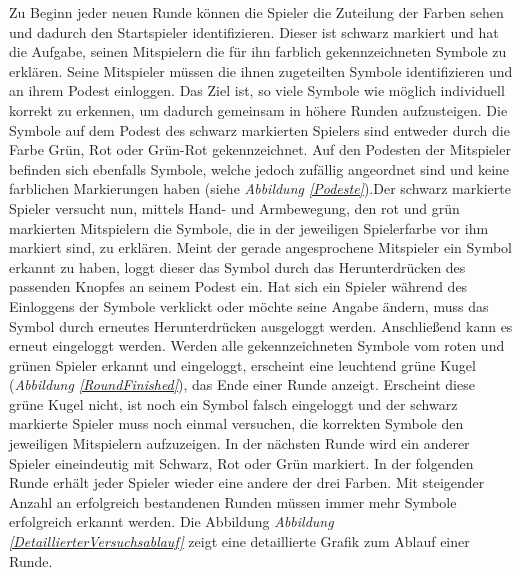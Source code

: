 \documentclass[a4paper,11pt]{article}%
\renewcommand{\\}{\vspace*{0.5\baselineskip} \newline}
\begin{document}
Zu Beginn jeder neuen Runde können die Spieler die Zuteilung der Farben sehen und dadurch den Startspieler identifizieren. Dieser ist schwarz markiert und hat die Aufgabe, seinen Mitspielern die für ihn farblich gekennzeichneten Symbole zu erklären. Seine Mitspieler müssen die ihnen zugeteilten Symbole identifizieren und an ihrem Podest einloggen. Das Ziel ist, so viele Symbole wie möglich individuell korrekt zu erkennen, um dadurch gemeinsam in höhere Runden aufzusteigen.
Die Symbole auf dem Podest des schwarz markierten Spielers sind entweder durch die Farbe Grün, Rot oder Grün-Rot gekennzeichnet. Auf den Podesten der Mitspieler befinden sich ebenfalls Symbole, welche jedoch zufällig angeordnet sind und keine farblichen Markierungen haben (siehe \textit{Abbildung \ref{Podeste}}).Der schwarz markierte Spieler versucht nun, mittels Hand- und Armbewegung, den rot und grün markierten Mitspielern die Symbole, die in der jeweiligen Spielerfarbe vor ihm markiert sind, zu erklären. Meint der gerade angesprochene Mitspieler ein Symbol erkannt zu haben, loggt dieser das Symbol durch das Herunterdrücken des passenden Knopfes an seinem Podest ein. Hat sich ein Spieler während des Einloggens der Symbole verklickt oder möchte seine Angabe ändern, muss das Symbol durch erneutes Herunterdrücken ausgeloggt werden. Anschließend kann es erneut eingeloggt werden. Werden alle gekennzeichneten Symbole vom roten und grünen Spieler erkannt und eingeloggt, erscheint eine leuchtend grüne Kugel (\textit{Abbildung \ref{RoundFinished}}), das Ende einer Runde anzeigt. Erscheint diese grüne Kugel nicht, ist noch ein Symbol falsch eingeloggt und der schwarz markierte Spieler muss noch einmal versuchen, die korrekten Symbole den jeweiligen Mitspielern aufzuzeigen. 
In der nächsten Runde wird ein anderer Spieler eineindeutig mit Schwarz, Rot oder Grün markiert.
In der folgenden Runde erhält jeder Spieler wieder eine andere der drei Farben. Mit steigender Anzahl an erfolgreich bestandenen Runden müssen immer mehr Symbole erfolgreich erkannt werden. 
Die Abbildung \textit{Abbildung \ref{DetaillierterVersuchsablauf}} zeigt eine detaillierte Grafik zum Ablauf einer Runde.
\end{document}
